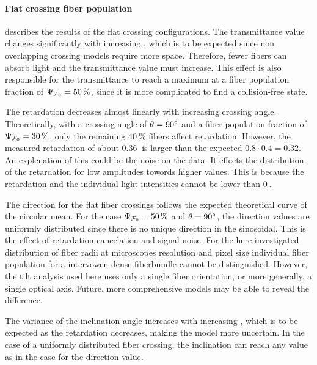 \paragraph{Flat crossing fiber population}
 describes the results of the flat crossing configurations.
The transmittance value changes significantly with increasing \modelOmega{}, which is to be expected since non overlapping crossing models require more space.
Therefore, fewer fibers can absorb light and the transmittance value must increase.
This effect is also responsible for the transmittance to reach a maximum at a fiber population fraction of $\textnormal{$\Psi_{\textnormal{$\mathcal{F}_0$}}$}=\SI{50}{\percent}$, since it is more complicated to find a collision-free state.
\par
%
The retardation decreases almost linearly with increasing crossing angle.
Theoretically, with a crossing angle of $\textnormal{$\theta$}=\SI{90}{\degree}$ and a fiber population fraction of $\textnormal{$\Psi_{\textnormal{$\mathcal{F}_0$}}$}=\SI{30}{\percent}$, only the remaining $\SI{40}{\percent}$ fibers affect retardation.
However, the measured retardation of about $\SI{0.36}{}$ is larger than the expected $0.8\cdot 0.4 = 0.32$.
An explenation of this could be the noise on the data.
It effects the distribution of the retardation for low amplitudes towords higher values.
This is because the retardation and the individual light intensities cannot be lower than $\SI{0}{}$.
\par
%
The direction for the flat fiber crossings follows the expected theoretical curve of the circular mean.
For the case $\textnormal{$\Psi_{\textnormal{$\mathcal{F}_0$}}$}=\SI{50}{\percent}$ and $\textnormal{$\theta$}=\SI{90}{\degree}$, the direction values are uniformly distributed since there is no unique direction in the sinosoidal.
This is the effect of retardation cancelation and signal noise.
For the here investigated distribution of fiber radii at microscopes resolution and pixel size individual fiber population for a intervowen dense fiberbundle cannot be distinguished.
However, the tilt analysis used here uses only a single fiber orientation, or more generally, a single optical axis.
Future, more comprehensive models may be able to reveal the difference.
\par
%
The variance of the inclination angle increases with increasing \modelOmega{}, which is to be expected as the retardation decreases, making the model more uncertain.
In the case of a uniformly distributed fiber crossing, the inclination can reach any value as in the case for the direction value.
\par
